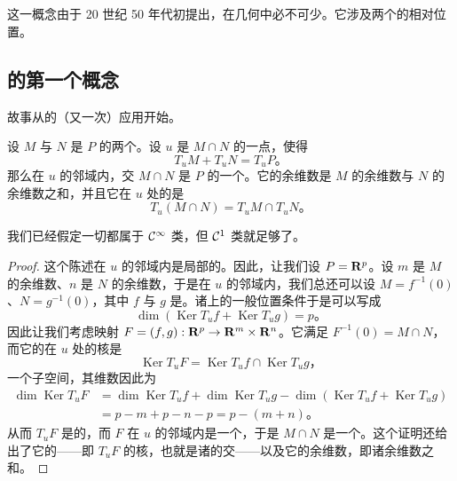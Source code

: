 
\section{\trTransversality}
\label{sec:appA-transversality}

这一概念由\trThom{}于 20 世纪 50 年代初提出，在几何中必不可少。它涉及两个\trSubmanifold{}的相对位置。

\subsection{\trTransversality{}的第一个概念}
\label{subsec:first-notion-transversality}

故事从\trImplicitFunctionTheorem{}的（又一次）应用开始。

\begin{theorem}\label{thm:tangent-sum-submanifold}
设 $M$ 与 $N$ 是\trManifold{} $P$ 的两个\trSubmanifold。设 $u$ 是 $M\cap N$ 的一点，使得
\[
T_{u}M+T_{u}N=T_{u}P\text{。}
\]
那么在 $u$ 的邻域内，交 $M\cap N$ 是 $P$ 的一个\trSubmanifold。它的余维数是 $M$ 的余维数与 $N$ 的余维数之和，并且它在 $u$ 处的\trTangentSpace{}是
\[
T_{u}(M\cap N)=T_{u}M\cap T_{u}N\text{。}
\]
\end{theorem}

我们已经假定一切都属于 $\mathcal{C}^{\infty}$ 类，但 $\mathcal{C}^{1}$ 类就足够了。

\begin{proof}
这个陈述在 $u$ 的邻域内是局部的。因此，让我们设 $P=\mathbf{R}^{p}$。设 $m$ 是 $M$ 的余维数、$n$ 是 $N$ 的余维数，于是在 $u$ 的邻域内，我们总还可以设 $M=f^{-1}(0)$、$N=g^{-1}(0)$，其中 $f$ 与 $g$ 是\trSubmersion。诸\trTangentSpace{}上的一般位置条件于是可以写成
\[
\dim(\operatorname{Ker}T_{u}f+\operatorname{Ker}T_{u}g)=p\text{。}
\]
因此让我们考虑映射 $F=(f,g):\mathbf{R}^{p}\to\mathbf{R}^{m}\times\mathbf{R}^{n}$。它满足 $F^{-1}(0)=M\cap N$，而它的\trDifferential{}在 $u$ 处的核是
\[
\operatorname{Ker}T_{u}F=\operatorname{Ker}T_{u}f\cap\operatorname{Ker}T_{u}g\text{，}
\]
一个子空间，其维数因此为
\[
\begin{aligned}
\dim\operatorname{Ker}T_{u}F&=\dim\operatorname{Ker}T_{u}f+\dim\operatorname{Ker}T_{u}g-\dim(\operatorname{Ker}T_{u}f+\operatorname{Ker}T_{u}g)\\
&=p-m+p-n-p=p-(m+n)\text{。}
\end{aligned}
\]
从而 $T_{u}F$ 是\trSurjective{}的，而 $F$ 在 $u$ 的邻域内是一个\trSubmersion，于是 $M\cap N$ 是一个\trSubmanifold。这个证明还给出了它的\trTangentSpace——即 $T_{u}F$ 的核，也就是诸\trTangentSpace{}的交——以及它的余维数，即诸余维数之和。
\end{proof}


